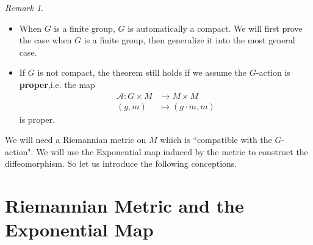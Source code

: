\documentclass[reqno,11pt]{amsart}
\numberwithin{equation}{section}
\theoremstyle{plain}
\theoremstyle{plain}
\numberwithin{equation}{section}
\theoremstyle{remark}
\newtheorem{remark}[theorem]{Remark}
\begin{document}
\begin{remark}\ 
	\begin{itemize}
		\item When $G$ is a finite group, $G$ is automatically a compact. We will first prove the case when $G$ is a finite group, then generalize it into the most general case.
		\item If $G$ is not compact, the theorem still holds if we assume the $G$-action is \textbf{proper},i.e. the map
		\begin{equation*}
		\begin{aligned}
			\mathcal{A}:G \times M &\longrightarrow M \times M\\
			(g,m)\;&\mapsto (g \cdot m,m)
		\end{aligned}
		\end{equation*}
	is proper.
	\end{itemize}
\end{remark}
We will need a Riemannian metric on $M$ which is ``compatible with the $G$-action". We will use the Exponential map induced by the metric to construct the diffeomorphism. So let us introduce the following conceptions. 

\section{Riemannian Metric and the Exponential Map}
\end{document}
